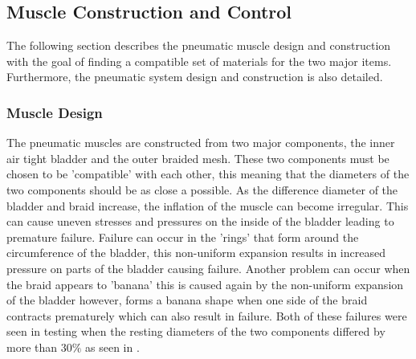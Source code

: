 \documentclass[11pt,a4paper]{article}
\begin{document}
\subsection{Muscle Construction and Control}
\label{sub:muscle_construction}

The following section describes the pneumatic muscle design and construction with the goal of finding a compatible set of materials for the two major items. Furthermore, the pneumatic system design and construction is also detailed.

\subsubsection{Muscle Design}
\label{subsubsection:muscle_design}
The pneumatic muscles are constructed from two major components, the inner air tight bladder and the outer braided mesh. These two components must be chosen to be 'compatible' with each other, this meaning that the diameters of the two components should be as close a possible. As the difference diameter of the bladder and braid increase, the inflation of the muscle can become irregular. This can cause uneven stresses and pressures on the inside of the bladder leading to premature failure. Failure can occur in the 'rings'  that form around the circumference of the bladder, this non-uniform expansion results in increased pressure on parts of the bladder causing failure. Another problem can occur when the braid appears to 'banana'  this is caused again by the non-uniform expansion of the bladder however, forms a banana shape when one side of the braid contracts prematurely which can also result in failure. Both of these failures were seen in testing when the resting diameters of the two components differed by more than $30\%$ as seen in .
\end{document}
